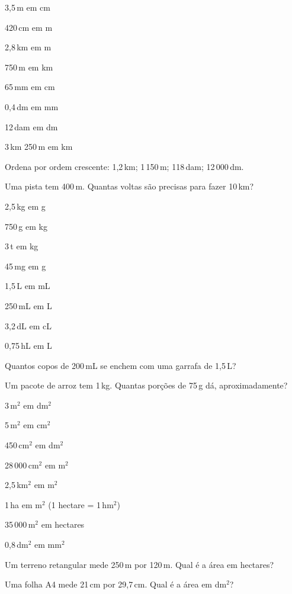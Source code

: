 \documentclass[12pt]{article}
\begin{document}


\begin{exercicios}
  \item 3,5\,m em cm
  \item 420\,cm em m
  \item 2,8\,km em m
  \item 750\,m em km
  \item 65\,mm em cm
  \item 0,4\,dm em mm
  \item 12\,dam em dm
  \item 3\,km 250\,m em km
  \item Ordena por ordem crescente: 1,2\,km; 1\,150\,m; 118\,dam; 12\,000\,dm.
  \item Uma pista tem 400\,m. Quantas voltas são precisas para fazer 10\,km?
\end{exercicios}

\begin{exercicios}
  \item 2,5\,kg em g
  \item 750\,g em kg
  \item 3\,t em kg
  \item 45\,mg em g
  \item 1,5\,L em mL
  \item 250\,mL em L
  \item 3,2\,dL em cL
  \item 0,75\,hL em L
  \item Quantos copos de 200\,mL se enchem com uma garrafa de 1,5\,L?
  \item Um pacote de arroz tem 1\,kg. Quantas porções de 75\,g dá, aproximadamente?
\end{exercicios}

\begin{exercicios}
  \item 3\,m$^2$ em dm$^2$
  \item 5\,m$^2$ em cm$^2$
  \item 450\,cm$^2$ em dm$^2$
  \item 28\,000\,cm$^2$ em m$^2$
  \item 2,5\,km$^2$ em m$^2$
  \item 1\,ha em m$^2$ (1 hectare = 1\,hm$^2$)
  \item 35\,000\,m$^2$ em hectares
  \item 0,8\,dm$^2$ em mm$^2$
  \item Um terreno retangular mede 250\,m por 120\,m. Qual é a área em hectares?
  \item Uma folha A4 mede 21\,cm por 29,7\,cm. Qual é a área em dm$^2$?
\end{exercicios}
\end{document}
